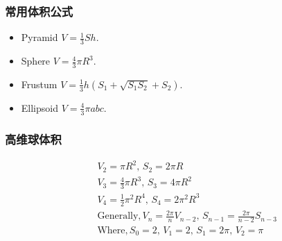 \begin{small}
\begin{spacing}{0.5}
\subsubsection{常用体积公式}
\begin{itemize}
\item Pyramid $V=\frac{1}{3}Sh$.
\item Sphere $V=\frac{4}{3}\pi R^3$.
\item Frustum $V=\frac{1}{3}h(S_1+\sqrt {S_1S_2}+S_2)$.
\item Ellipsoid $V=\frac{4}{3} \pi abc$.
\end{itemize}
\subsubsection{高维球体积}
\begin{eqnarray*}
&& V_2=\pi R^2,\, S_2=2\pi R \\
&& V_3=\frac{4}{3}\pi R^3,\, S_3=4\pi R^2 \\
&& V_4=\frac{1}{2}\pi ^2 R^4,\, S_4=2\pi ^2 R^3 \\
&& \mathrm{Generally}, V_n=\frac{2\pi}{n}V_{n-2},\, S_{n-1}=\frac{2\pi}{n-2}S_{n-3} \\
&& \mathrm{Where}, S_0=2,\, V_1=2,\, S_1=2\pi ,\, V_2=\pi
\end{eqnarray*}
\end{spacing}
\end{small}
